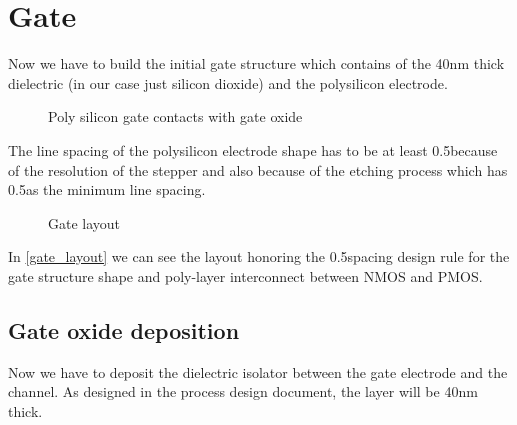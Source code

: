 \section{Gate}\label{gate_chapter}
Now we have to build the initial gate structure which contains of the 40nm thick dielectric (in our case just silicon dioxide) and the polysilicon electrode.

\begin{figure}[H]
	\centering
	\begin{tikzpicture}[node distance = 3cm, auto, thick,scale=\CrossAndTopSectionBig, every node/.style={transform shape}]
		
	\end{tikzpicture}
	\begin{tikzpicture}[node distance = 3cm, auto, thick,scale=\CrossAndTopSectionBig, every node/.style={transform shape}]
		
	\end{tikzpicture}
	\caption{Poly silicon gate contacts with gate oxide}
\end{figure}

The line spacing of the polysilicon electrode shape has to be at least 0.5\um because of the resolution of the stepper and also because of the etching process which has 0.5\um as the minimum line spacing.

\begin{figure}[H]
	\centering
	\begin{tikzpicture}[node distance =1cm, auto, thick,scale=\VLSILayout, every node/.style={transform shape}]
		
	\end{tikzpicture}
	\caption{Gate layout}
	\label{gate_layout}
\end{figure}

In \autoref{gate_layout} we can see the layout honoring the 0.5\um spacing design rule for the gate structure shape and poly-layer interconnect between NMOS and PMOS.

\newpage

\subsection{Gate oxide deposition}\label{step_growing_gate_oxide}

Now we have to deposit the dielectric isolator between the gate electrode and the channel.
As designed in the process design document, the layer will be 40nm thick.

